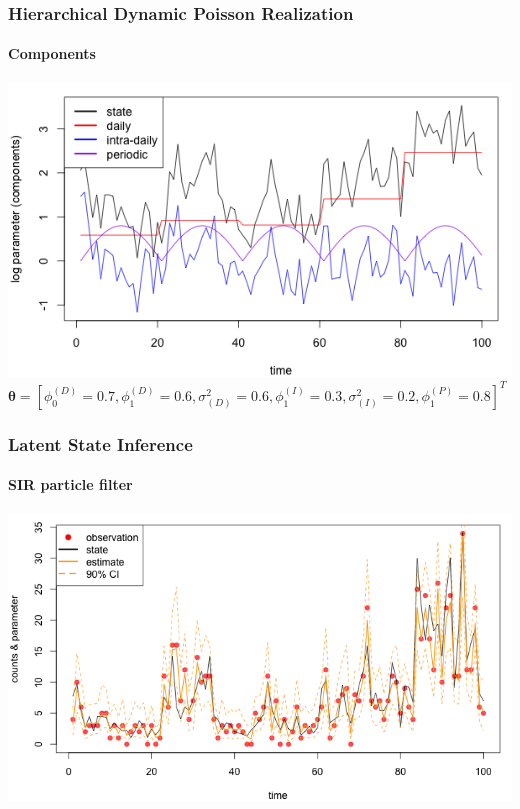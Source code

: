 \documentclass[11pt]{beamer}
\begin{document}
\begin{frame}
\frametitle{Hierarchical Dynamic Poisson Realization}
\framesubtitle{Components}
\centering
\includegraphics[scale=0.45]{hdpm-log-param}\\
\bigskip
\small
$\boldsymbol{\theta} = [ \phi_0^{(D)} = 0.7,  \phi_1^{(D)} = 0.6, \sigma^2_{(D)} = 0.6, \phi_1^{(I)} = 0.3, \sigma^2_{(I)} = 0.2, \phi_1^{(P)} = 0.8]^T$
\par
\end{frame}

\begin{frame}
\frametitle{Latent State Inference}
\framesubtitle{SIR particle filter}
\centering
\includegraphics[scale=0.45]{hdpm-est}
\end{frame}
\end{document}

